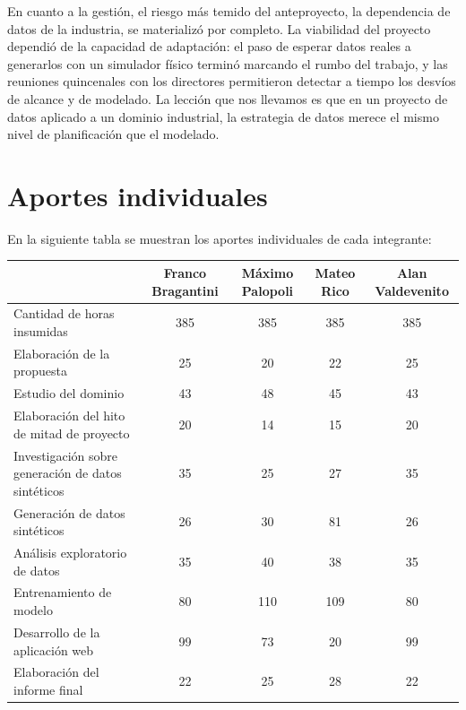 \documentclass[12pt,a4paper]{article}
\begin{document}
En cuanto a la gestión, el riesgo más temido del anteproyecto, la dependencia de datos de
la industria, se materializó por completo. La viabilidad del proyecto dependió de la
capacidad de adaptación: el paso de esperar datos reales a generarlos con un simulador
físico terminó marcando el rumbo del trabajo, y las reuniones quincenales con los
directores permitieron detectar a tiempo los desvíos de alcance y de modelado. La lección
que nos llevamos es que en un proyecto de datos aplicado a un dominio industrial, la
estrategia de datos merece el mismo nivel de planificación que el modelado.


\newpage
\section{Aportes individuales}

En la siguiente tabla se muestran los aportes individuales de cada integrante:

\begin{table}[H]
\centering
\begin{tabular}{|>{\raggedright\arraybackslash}p{4cm}|c|c|c|c|}
  \hline
   & \textbf{Franco Bragantini} & \textbf{Máximo Palopoli} & \textbf{Mateo Rico} & \textbf{Alan Valdevenito} \\
  \hline
  Cantidad de horas insumidas & 385 & 385 & 385 & 385 \\
  \hline
  Elaboración de la propuesta & 25 & 20 & 22 & 25\\
  \hline
  Estudio del dominio & 43 & 48 & 45 & 43\\
  \hline
  Elaboración del hito de mitad de proyecto & 20 & 14 & 15 & 20 \\
  \hline
  Investigación sobre generación de datos sintéticos & 35 & 25 & 27 & 35\\
  \hline
  Generación de datos sintéticos & 26 & 30 & 81 & 26 \\
  \hline
  Análisis exploratorio de datos & 35 & 40 & 38 & 35 \\
  \hline
  Entrenamiento de modelo & 80 & 110 & 109 & 80 \\
  \hline
  Desarrollo de la aplicación web & 99 & 73 & 20 & 99 \\
  \hline
  Elaboración del informe final & 22 & 25 & 28 & 22 \\
  \hline
\end{tabular}
\end{table}
\end{document}
